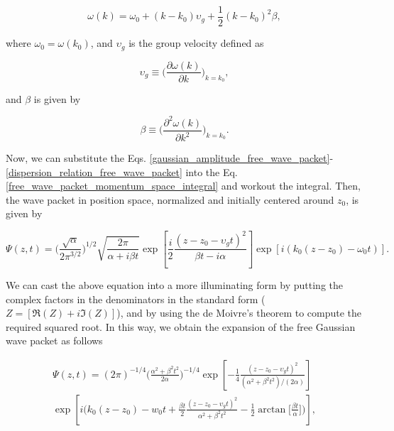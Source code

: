 \documentclass{article}
\begin{document}
\begin{equation}\label{dispersion_relation_free_wave_packet}
    \omega(k) = \omega_{0} + (k-k_{0})\upsilon_{g} + \frac{1}{2}(k-k_{0})^{2} \beta ,
\end{equation}

where $\omega_{0}=\omega(k_{0})$, and $\upsilon_{g}$ is the group velocity defined as

\begin{equation}
    \upsilon_{g} \equiv \bigg(\frac{\partial \omega(k)}{\partial k}\bigg)_{k=k_{0}},
\end{equation}

and $\beta$ is given by

\begin{equation}
    \beta \equiv \bigg(\frac{\partial^2 \omega(k)}{\partial k^2}\bigg)_{k=k_{0}}.
\end{equation}

Now, we can substitute the Eqs. \ref{gaussian_amplitude_free_wave_packet}-\ref{dispersion_relation_free_wave_packet} into the Eq. \ref{free_wave_packet_momentum_space_integral} and workout the integral. Then, the wave packet in position space, normalized and initially centered around $z_{0}$, is given by

\begin{equation}
    \Psi (z, t) = \bigg(\frac{\sqrt{\alpha}}{2 \pi ^{3/2}} \bigg)^{1/2} \sqrt{\frac{2 \pi}{\alpha + i \beta t}} \exp \left[{\frac{i}{2}\frac{(z - z_{0} - \upsilon_{g} t)^{2}}{\beta t - i \alpha}} \right]  \exp[{i (k_{0}(z-z_{0})-\omega_{0} t)}].
\end{equation}

We can cast the above equation into a more illuminating form by putting the complex factors in the denominators in the standard form ($Z = [\Re(Z)+i\Im(Z)]$), and by using the de Moivre's theorem to compute the required squared root. In this way, we obtain the expansion of the free Gaussian wave packet as follows

\begin{multline}\label{free_wave_packet_position_space_centered_0} 
    \Psi (z, t) = (2\pi)^{-1/4} \bigg(\frac{\alpha^{2} + \beta^{2} t^{2}}{2\alpha}\bigg)^{-1/4} \exp \left[-\frac{1}{4} \frac{ (z - z_{0} - \upsilon_{g} t)^{2}}{(\alpha^{2} + \beta^{2}t^{2})/(2\alpha)}  \right] \\ \exp \left[i \bigg(k_{0}(z-z_{0}) - w_{0}t + \frac{\beta t}{2}\frac{(z - z_{0} - \upsilon_{g} t)^{2}}{\alpha^{2} + \beta^{2}t^{2}} - \frac{1}{2} \arctan\bigg[\frac{\beta t}{\alpha}\bigg]\bigg) \right],
\end{multline}
\end{document}

